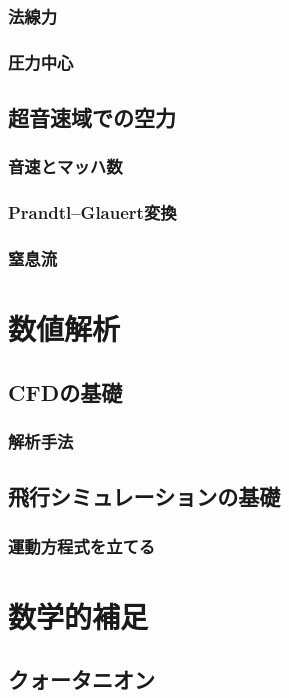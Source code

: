 \documentclass[uplatex,dvipdfmx,a4j,11pt]{jsreport}
\numberwithin{equation}{chapter}
\begin{document}
\subsection{法線力}
\subsection{圧力中心}


\section{超音速域での空力}
\subsection{音速とマッハ数}

\subsection{Prandtl--Glauert変換}

\subsection{窒息流}


\chapter{数値解析}

\section{CFDの基礎}
\subsection{解析手法}

\section{飛行シミュレーションの基礎}
\subsection{運動方程式を立てる}


\appendix

\chapter{数学的補足}
\section{クォータニオン}
\end{document}
